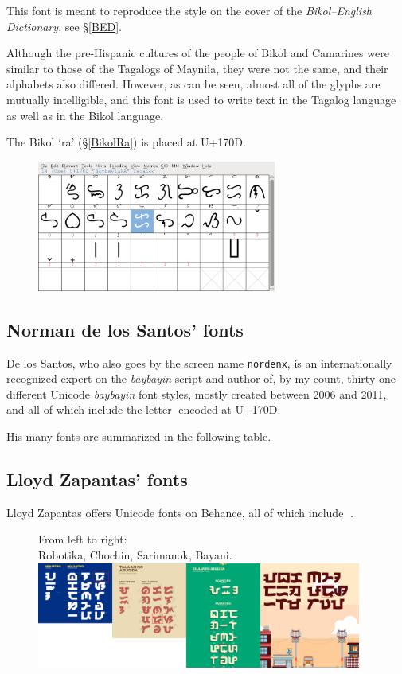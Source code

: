 \documentclass[a4paper,pagesize,openany,14pt,parskip=never]{scrbook}
\newcommand{\≈}{$\approx$}
\newcommand{\ra}{{\baybayin ᜍ}}
\begin{document}
This font is meant to reproduce the style on the cover of the {\em Bikol--English Dictionary}, see \S\ref{BED}.

Although the pre-Hispanic cultures of the people of Bikol and Camarines were similar to those of the Tagalogs of Maynila, they were not the same, and their alphabets also differed. However, as can be seen, almost all of the glyphs are mutually intelligible, and this font is used to write text in the Tagalog language as well as in the Bikol language.

The Bikol `ra' (\S\ref{BikolRa}) is placed at U+170D.

\begin{figure}[H]
\includegraphics[width=0.7\textwidth]{BikolMintz}
\end{figure}

\subsection{Norman de los Santos' fonts}
\label{Nordenx}

De los Santos, who also goes by the screen name \texttt{nordenx}, is an internationally recognized expert on the {\em baybayin} script and author of, by my count, thirty-one different Unicode {\em baybayin} font styles, mostly created between 2006 and 2011, and all of which include the letter \ra encoded at U+170D.

His many fonts are summarized in the following table.



\subsection{Lloyd Zapantas' fonts}
\label{Lloyd}

Lloyd Zapantas offers Unicode fonts on Behance, all of which include \ra.

\begin{figure}[H]
    From left to right: \\ 
    Robotika, Chochin, Sarimanok, Bayani. \\
\includegraphics[width=0.95\textwidth]{ZapantasFonts}
\end{figure}
\end{document}
